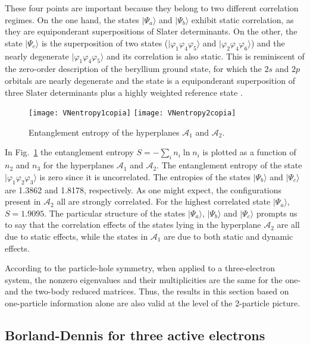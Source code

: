 \documentclass[aps,twocolumn,showpacs,pra,superscriptaddress,floatfix,longbibliography]{revtex4-1}
\newcommand{\7}{\dagger}
\newcommand{\ket}[1]{\mbox{$| #1 \rangle$}}
\begin{document}
These four points are important because they belong to two 
different correlation regimes.  On the one hand, the states 
$\ket{\Psi_a}$ and $\ket{\Psi_b}$ exhibit static correlation, 
as they are equiponderant superpositions of Slater 
determinants. On the other, the state $\ket{\Psi_c}$
is the superposition of two states
($ \ket{\varphi_1\varphi_4\varphi_5}$ and
$\ket{\varphi_2\varphi_4\varphi_6}$) and the nearly
degenerate $\ket{\varphi_1\varphi_4\varphi_5}$ and 
its correlation is also static. 
This is reminiscent of the zero-order description of the 
beryllium ground state, for which the $2s$ and $2p$ orbitals 
are nearly degenerate and the state is a equiponderant 
superposition of three Slater determinants plus a highly 
weighted reference state  \cite{TewKlopperHelgaker}.

\begin{figure}[ht] 
 \centering
\texttt{[image: VNentropy1copia]}
\texttt{[image: VNentropy2copia]}
\caption{Entanglement entropy of the hyperplanes $\mathcal{A}_1$
and $\mathcal{A}_2$.}
 \label{graf:VN}
 \end{figure}
 
In Fig.~\ref{graf:VN} the entanglement entropy $S = -\sum_i 
n_i \ln n_i$ is plotted as a function of $n_2$ and $n_3$ for 
the hyperplanes $\mathcal{A}_1$ and $\mathcal{A}_2$. 
The entanglement entropy of the state 
$\ket{\varphi_1\varphi_2\varphi_3}$ is zero since it is 
uncorrelated.  The entropies
of the states $\ket{\Psi_b}$ and $\ket{\Psi_c}$
are 1.3862 and 1.8178, respectively. As one might expect,
the configurations present in $\mathcal{A}_2$ all are 
strongly correlated. For the highest correlated state 
$\ket{\Psi_a}$, $S = 1.9095$. 
The particular structure of the states $\ket{\Psi_a}$, $\ket{\Psi_b}$
and $\ket{\Psi_c}$ prompts us to say that the correlation effects 
of the states lying in the hyperplane $\mathcal{A}_2$ are all due 
to static effects, while the states in $\mathcal{A}_1$ are due to
both static and dynamic effects.

According to the particle-hole symmetry, when 
applied to a three-electron system, the nonzero
eigenvalues and their multiplicities are the 
same for the one- and the two-body reduced 
matrices. Thus, the results in this section based 
on one-particle information alone are also valid 
at the level of the 2-particle picture.


 \subsection{Borland-Dennis for three active electrons}
 
\end{document}
